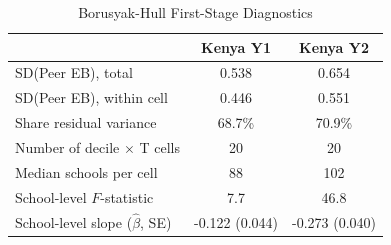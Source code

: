 \begin{table}[htbp]
\centering\small
\caption{Borusyak-Hull First-Stage Diagnostics}
\label{tab:bh_firststage}
\begin{tabular}{lcc}
\toprule
 & Kenya Y1 & Kenya Y2 \\
\midrule
SD(Peer EB), total & 0.538 & 0.654 \\
SD(Peer EB), within cell & 0.446 & 0.551 \\
Share residual variance & 68.7\% & 70.9\% \\
Number of decile $\times$ T cells & 20 & 20 \\
Median schools per cell & 88 & 102 \\
School-level $F$-statistic & 7.7 & 46.8 \\
School-level slope ($\hat{\beta}$, SE) & -0.122 (0.044) & -0.273 (0.040) \\
\bottomrule
\end{tabular}
\par\smallskip{}
\end{table}